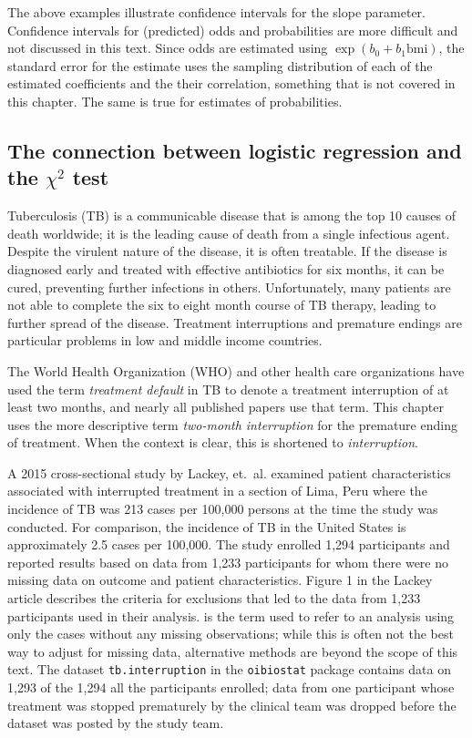 The above examples illustrate confidence intervals for the slope parameter.  Confidence intervals for (predicted) odds and probabilities are more difficult and not discussed in this text.  Since odds are estimated using $\exp(b_0 + b_1 \textrm{bmi})$, the standard error for the estimate uses the sampling distribution of each of the estimated coefficients and the their correlation, something that is not covered in this chapter.  The same is true for estimates of probabilities.


\subsection{The connection between logistic regression and the $\chi^2$ test}\label{section:logisticChiSqTest}


Tuberculosis (TB) is a communicable disease that is among the top 10 causes of death worldwide; it is the leading cause of death from a single infectious agent.   Despite the virulent nature of the disease, it is often treatable.  If the disease is diagnosed early and treated with effective antibiotics for six months, it can be cured, preventing further infections in others. Unfortunately, many patients are not able to complete the six to eight month course of TB therapy, leading to further spread of the disease.  Treatment interruptions and premature endings are particular problems in low and middle income countries.

The World Health Organization (WHO) and other health care organizations have used the term \textit{treatment default} in TB to denote a treatment interruption of at least two months, and nearly all published papers use that term. This chapter uses the more descriptive term \textit{two-month interruption} for the premature ending of treatment.  When the context is clear, this is shortened to \textit{interruption}.

A 2015 cross-sectional study by Lackey, et.\ al.   examined patient characteristics associated with interrupted treatment in a section of Lima, Peru where the incidence of TB was 213 cases per 100,000 persons at the time the study was conducted. For comparison, the incidence of TB in the United States is approximately 2.5 cases per 100,000.   The study enrolled 1,294 participants and reported results based on data from 1,233 participants for whom there were no missing data on outcome and patient characteristics. Figure 1 in the Lackey article describes the criteria for exclusions that led to the data from 1,233 participants used in their analysis.  is the term used to refer to an analysis using only the cases without any missing observations; while this is often not the best way to adjust for missing data, alternative methods are beyond the scope of this text. The dataset \texttt{tb.interruption} in the \texttt{oibiostat} package contains data on 1,293 of the 1,294 all the participants enrolled; data from one participant whose treatment was stopped prematurely by the clinical team  was dropped before the dataset was posted by the study team.  


